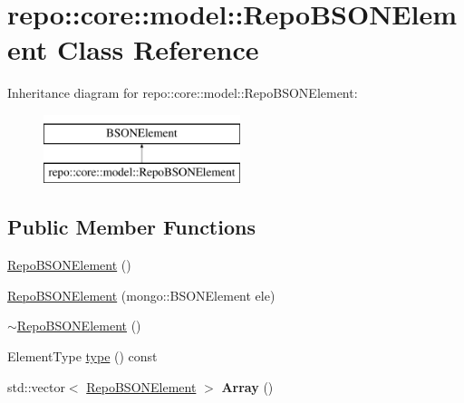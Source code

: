 \hypertarget{classrepo_1_1core_1_1model_1_1_repo_b_s_o_n_element}{}\section{repo\+:\+:core\+:\+:model\+:\+:Repo\+B\+S\+O\+N\+Element Class Reference}
\label{classrepo_1_1core_1_1model_1_1_repo_b_s_o_n_element}
Inheritance diagram for repo\+:\+:core\+:\+:model\+:\+:Repo\+B\+S\+O\+N\+Element\+:\begin{figure}[H]
\begin{center}
\leavevmode
\includegraphics[height=2.000000cm]{classrepo_1_1core_1_1model_1_1_repo_b_s_o_n_element}
\end{center}
\end{figure}
\subsection*{Public Member Functions}
\begin{DoxyCompactItemize}
\item 
\hyperlink{classrepo_1_1core_1_1model_1_1_repo_b_s_o_n_element_ac90a539b9e6e62b6178f05dc8ca3449a}{Repo\+B\+S\+O\+N\+Element} ()
\item 
\hyperlink{classrepo_1_1core_1_1model_1_1_repo_b_s_o_n_element_a8739189159c94059b0aee8fc54824858}{Repo\+B\+S\+O\+N\+Element} (mongo\+::\+B\+S\+O\+N\+Element ele)
\item 
\hyperlink{classrepo_1_1core_1_1model_1_1_repo_b_s_o_n_element_aea7a17c6764257a19347bb4ff0897d12}{$\sim$\+Repo\+B\+S\+O\+N\+Element} ()
\item 
Element\+Type \hyperlink{classrepo_1_1core_1_1model_1_1_repo_b_s_o_n_element_ac267633e0b010be90a8041d0365c2b8d}{type} () const 
\item 
\hypertarget{classrepo_1_1core_1_1model_1_1_repo_b_s_o_n_element_afdd43bff95f977511151eb4e728d63e9}{}std\+::vector$<$ \hyperlink{classrepo_1_1core_1_1model_1_1_repo_b_s_o_n_element}{Repo\+B\+S\+O\+N\+Element} $>$ {\bfseries Array} ()\label{classrepo_1_1core_1_1model_1_1_repo_b_s_o_n_element_afdd43bff95f977511151eb4e728d63e9}

\end{DoxyCompactItemize}


